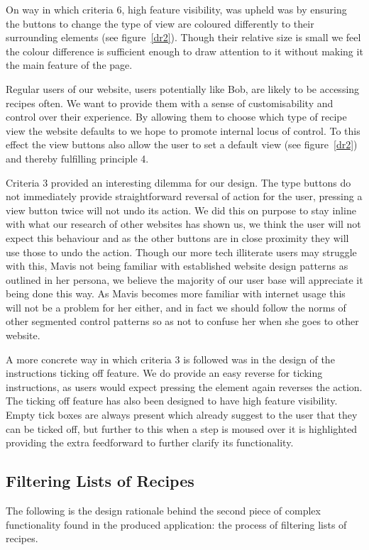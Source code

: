 On way in which criteria 6, high feature visibility, was upheld was by ensuring the buttons to change the type of view are coloured differently to their surrounding elements (see figure~\ref{dr2}). Though their relative size is small we feel the colour difference is sufficient enough to draw attention to it without making it the main feature of the page.

Regular users of our website, users potentially like Bob, are likely to be accessing recipes often. We want to provide them with a sense of customisability and control over their experience. By allowing them to choose which type of recipe view the website defaults to we hope to promote internal locus of control. To this effect the view buttons also allow the user to set a default view (see figure~\ref{dr2}) and thereby fulfilling principle 4.

Criteria 3 provided an interesting dilemma for our design. The type buttons do not immediately provide straightforward reversal of action for the user, pressing a view button twice will not undo its action. We did this on purpose to stay inline with what our research of other websites has shown us, we think the user will not expect this behaviour and as the other buttons are in close proximity they will use those to undo the action. Though our more tech illiterate users may struggle with this, Mavis not being familiar with established website design patterns as outlined in her persona, we believe the majority of our user base will appreciate it being done this way. As Mavis becomes more familiar with internet usage this will not be a problem for her either, and in fact we should follow the norms of other segmented control patterns so as not to confuse her when she goes to other website.  

A more concrete way in which criteria 3 is followed was in the design of the instructions ticking off feature. We do provide an easy reverse for ticking instructions, as users would expect pressing the element again reverses the action. The ticking off feature has also been designed to have high feature visibility. Empty tick boxes are always present which already suggest to the user that they can be ticked off, but further to this when a step is moused over it is highlighted providing the extra feedforward to further clarify its functionality.

\subsection{Filtering Lists of Recipes}
The following is the design rationale behind the second piece of complex functionality found in the produced application: the process of filtering lists of recipes.

